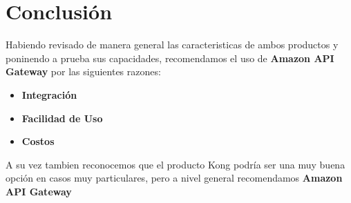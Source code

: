 \section{Conclusión}

Habiendo revisado de manera general las caracteristicas de ambos productos y
poninendo a prueba sus capacidades, recomendamos el uso de \textbf{Amazon API Gateway}
por las siguientes razones:
\begin{itemize}
  \item \textbf{Integración}
  \item \textbf{Facilidad de Uso}
  \item \textbf{Costos}
\end{itemize}
A su vez tambien reconocemos que el producto Kong podría ser una muy buena opción en
casos muy particulares, pero a nivel general recomendamos \textbf{Amazon API Gateway}
